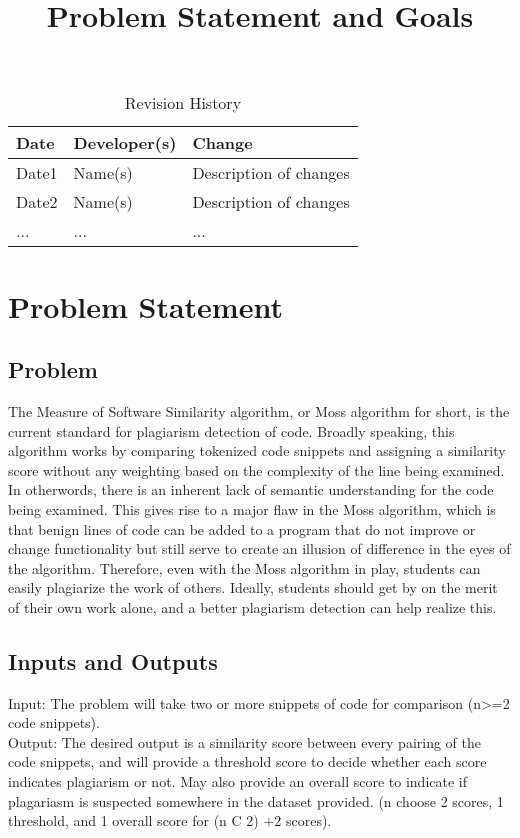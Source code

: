 \documentclass{article}
\title{Problem Statement and Goals\\\progname}
\author{\authname}
\date{}
\begin{document}
\maketitle

\begin{table}[hp]
\caption{Revision History} \label{TblRevisionHistory}
\begin{tabularx}{\textwidth}{llX}
\toprule
\textbf{Date} & \textbf{Developer(s)} & \textbf{Change}\\
\midrule
Date1 & Name(s) & Description of changes\\
Date2 & Name(s) & Description of changes\\
... & ... & ...\\
\bottomrule
\end{tabularx}
\end{table}

\section{Problem Statement}



\subsection{Problem}
The Measure of Software Similarity algorithm, or Moss algorithm for short, is the current standard for plagiarism detection of code. Broadly speaking, this algorithm works by comparing tokenized code snippets and assigning a similarity score without any weighting based on the complexity of the line being examined. In otherwords, there is an inherent lack of semantic understanding for the code being examined. This gives rise to a major flaw in the Moss algorithm, which is that benign lines of code can be added to a program that do not improve or change functionality but still serve to create an illusion of difference in the eyes of the algorithm. Therefore, even with the Moss algorithm in play, students can easily plagiarize the work of others. Ideally, students should get by on the merit of their own work alone, and a better plagiarism detection can help realize this.

\subsection{Inputs and Outputs}
Input: The problem will take two or more snippets of code for comparison (n>=2 code snippets). \\
Output: The desired output is a similarity score between every pairing of the code snippets, and will provide a threshold score to decide whether each score indicates plagiarism or not. May also provide an overall score to indicate if plagariasm is suspected somewhere in the dataset provided. (n choose 2 scores, 1 threshold, and 1 overall score for (n C 2) +2 scores). 
\end{document}
